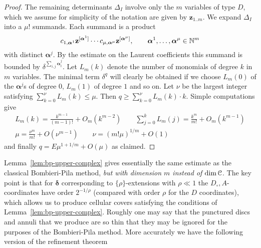 \documentclass[reqno]{amsart}
\renewcommand\ge{\geqslant} \renewcommand\le{\leqslant}
\renewcommand\~[1]{\widetilde{#1}}
\def\vz{{\mathbf z}}
\def\valpha{{\boldsymbol\alpha}}
\def\vdelta{{\boldsymbol\delta}}
\def\he#1{{\{#1\}}}
\def\hrho{{\he\rho}}
\begin{document}
\begin{proof}
  The remaining determinants $\Delta_I$ involve only the $m$ variables
  of type $D$, which we assume for simplicity of the notation are
  given by $\vz_{1..m}$. We expand $\Delta_I$ into a $\mu!$
  summands. Each summand is a product
  \begin{equation}
    c_{1,\valpha^1}\vz^{[\valpha^1]}\cdots c_{\mu,\valpha^\mu}\vz^{[\valpha^\mu]}, \qquad \valpha^1,\ldots,\valpha^\mu\in\N^m
  \end{equation}
  with distinct $\valpha^j$. By the estimate on the Laurent
  coefficients this summand is bounded by
  $\delta^{\sum_{i,j}\valpha_i^j}$. Let $L_m(k)$ denote the number of
  monomials of degree $k$ in $m$ variables. The minimal term
  $\delta^q$ will clearly be obtained if we choose $L_m(0)$ of the
  $\valpha^j$s of degree 0, $L_m(1)$ of degree $1$ and so on. Let
  $\nu$ be the largest integer satisfying
  $\sum_{k=0}^\nu L_m(k) \le \mu$. Then
  $q\ge\sum_{k=0}^\nu L_m(k)\cdot k$. Simple computations give
  \begin{equation}
    \begin{gathered}
      L_m(k) = \frac{k^{m-1}}{(m-1)!}+O_m(k^{m-2}) \qquad  \sum_{j=0}^k L_m(j) = \frac{k^m}{m!} + O_m(k^{m-1}) \\
      \mu =\frac{\nu^m}{m!}+O(\nu^{m-1}) \qquad  \nu = (m!\mu)^{1/m}+O(1)        
    \end{gathered}
  \end{equation}
  and finally $q=E\mu^{1+1/m}+O(\mu)$ as claimed.
\end{proof}

Lemma~\ref{lem:bp-upper-complex} gives essentially the same estimate
as the classical Bombieri-Pila method, \emph{but with dimension $m$
  instead of $\dim{\mathcal C}$}. The key point is that for $\vdelta$
corresponding to $\hrho$-extensions with $\rho\ll1$ the
$D_\circ,A$-coordinates have order $2^{-1/\rho}$ (compared with order
$\rho$ for the $D$ coordinates), which allows us to produce cellular
covers satisfying the conditions of
Lemma~\ref{lem:bp-upper-complex}. Roughly one may say that the
punctured discs and annuli that we produce are so thin that they may
be ignored for the purposes of the Bombieri-Pila method. More
accurately we have the following version of the refinement theorem
\end{document}

